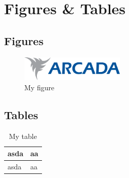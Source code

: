 \section{Figures \& Tables}

\subsection{Figures}

\begin{figure}[ht]
  \includegraphics[width=5cm]{logo.pdf}
  \caption{My figure}
\end{figure}

\subsection{Tables}

\begin{table}[ht]
  \caption{My table}
  \begin{tabular}{ | l | p{2cm} | }
    \hline
    asda & aa \\ \hline
    asda & aa \\ \hline
  \end{tabular}
  \label{tab:myfirsttable}
\end{table}
